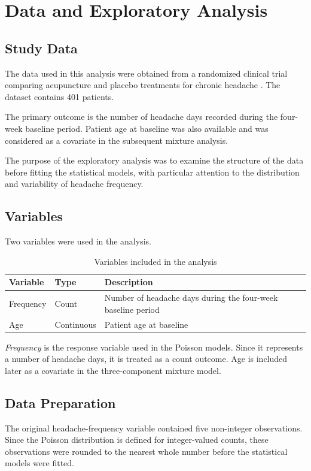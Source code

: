 \section{Data and Exploratory Analysis}
\label{sec:data}
\subsection{Study Data}
The data used in this analysis were obtained from a randomized clinical trial comparing acupuncture and placebo treatments for chronic headache \citep{Vickers2004}. The dataset contains 401 patients.

The primary outcome is the number of headache days recorded during the four-week baseline period. Patient age at baseline was also available and was considered as a covariate in the subsequent mixture analysis.

The purpose of the exploratory analysis was to examine the structure of the data before fitting the statistical models, with particular attention to the distribution and variability of headache frequency.

\subsection{Variables}
Two variables were used in the analysis.
\begin{table}[H]
\centering
\caption{Variables included in the analysis}
\label{tab:variables}
\begin{tabular}{lll}
\toprule
\textbf{Variable} & \textbf{Type} & \textbf{Description} \\
\midrule
Frequency & Count & Number of headache days during the four-week baseline period \\
Age & Continuous & Patient age at baseline \\
\bottomrule
\end{tabular}
\end{table}
\textit{Frequency} is the response variable used in the Poisson models. Since it represents a number of headache days, it is treated as a count outcome. Age is included later as a covariate in the three-component mixture model.

\subsection{Data Preparation}
The original headache-frequency variable contained five non-integer observations. Since the Poisson distribution is defined for integer-valued counts, these observations were rounded to the nearest whole number before the statistical models were fitted.

